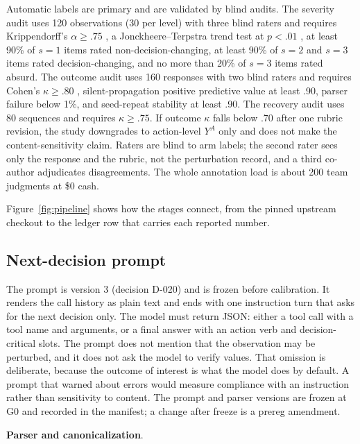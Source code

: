 \documentclass[a4paper,fleqn]{cas-sc}
\begin{document}
Automatic labels are primary and are validated by blind audits. The severity audit uses 120
observations (30 per level) with three blind raters and requires Krippendorff's
$\alpha \ge .75$ \cite{krippendorff}, a Jonckheere--Terpstra trend test at $p<.01$
\cite{jonckheere1954}, at least 90\% of $s=1$ items rated non-decision-changing, at least 90\% of
$s=2$ and $s=3$ items rated decision-changing, and no more than 20\% of $s=3$ items rated absurd.
The outcome audit uses 160 responses with two blind raters and requires Cohen's
$\kappa \ge .80$ \cite{cohen1960}, silent-propagation positive predictive value at least .90,
parser failure below 1\%, and seed-repeat stability at least .90. The recovery audit uses 80
sequences and requires $\kappa \ge .75$. If outcome $\kappa$ falls below .70 after one rubric
revision, the study downgrades to action-level $Y^{A}$ only and does not make the
content-sensitivity claim. Raters are blind to arm labels; the second rater sees only the response
and the rubric, not the perturbation record, and a third co-author adjudicates disagreements. The
whole annotation load is about 200 team judgments at \$0 cash.



Figure~\ref{fig:pipeline} shows how the stages connect, from the pinned upstream checkout to the
ledger row that carries each reported number.

\subsection{Next-decision prompt}



The prompt is version 3 (decision D-020) and is frozen before calibration. It renders the call
history as plain text and ends with one instruction turn that asks for the next decision only. The model must
return JSON: either a tool call with a tool name and arguments, or a final answer with an action
verb and decision-critical slots. The prompt does not mention that the observation may be
perturbed, and it does not ask the model to verify values. That omission is deliberate, because
the outcome of interest is what the model does by default. A prompt that warned about errors
would measure compliance with an instruction rather than sensitivity to content. The prompt and
parser versions are frozen at G0 and recorded in the manifest; a change after freeze is a
prereg amendment.

\noindent\textbf{Parser and canonicalization}.\
\end{document}

